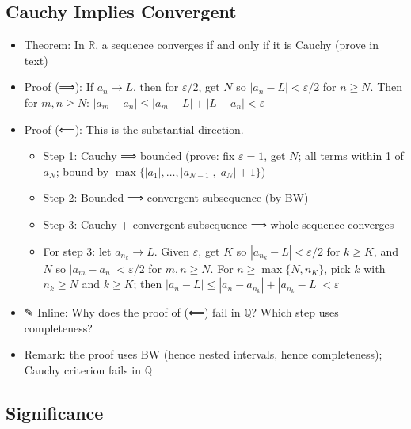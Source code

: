 \documentclass[
  10pt,
  letterpaper,
]{scrbook}
\providecommand{\tightlist}{%
  \setlength{\itemsep}{0pt}\setlength{\parskip}{0pt}}
\newcommand{\QQ}{\mathbb{Q}}
\newcommand{\RR}{\mathbb{R}}
\begin{document}
\subsection{Cauchy Implies Convergent}\label{cauchy-implies-convergent}

\begin{itemize}
\tightlist
\item
  Theorem: In \(\RR\), a sequence converges if and only if it is Cauchy
  (prove in text)
\item
  Proof (⟹): If \(a_n \to L\), then for \(\varepsilon/2\), get \(N\) so
  \(|a_n - L| < \varepsilon/2\) for \(n \geq N\). Then for
  \(m, n \geq N\):
  \(|a_m - a_n| \leq |a_m - L| + |L - a_n| < \varepsilon\)
\item
  Proof (⟸): This is the substantial direction.

  \begin{itemize}
  \tightlist
  \item
    Step 1: Cauchy ⟹ bounded (prove: fix \(\varepsilon = 1\), get \(N\);
    all terms within 1 of \(a_N\); bound by
    \(\max\{|a_1|, \ldots, |a_{N-1}|, |a_N| + 1\}\))
  \item
    Step 2: Bounded ⟹ convergent subsequence (by BW)
  \item
    Step 3: Cauchy + convergent subsequence ⟹ whole sequence converges
  \item
    For step 3: let \(a_{n_k} \to L\). Given \(\varepsilon\), get \(K\)
    so \(|a_{n_k} - L| < \varepsilon/2\) for \(k \geq K\), and \(N\) so
    \(|a_m - a_n| < \varepsilon/2\) for \(m, n \geq N\). For
    \(n \geq \max\{N, n_K\}\), pick \(k\) with \(n_k \geq N\) and
    \(k \geq K\); then
    \(|a_n - L| \leq |a_n - a_{n_k}| + |a_{n_k} - L| < \varepsilon\)
  \end{itemize}
\item
  ✎ Inline: Why does the proof of (⟸) fail in \(\QQ\)? Which step uses
  completeness?
\item
  Remark: the proof uses BW (hence nested intervals, hence
  completeness); Cauchy criterion fails in \(\QQ\)
\end{itemize}

\subsection{Significance}\label{significance}
\end{document}

